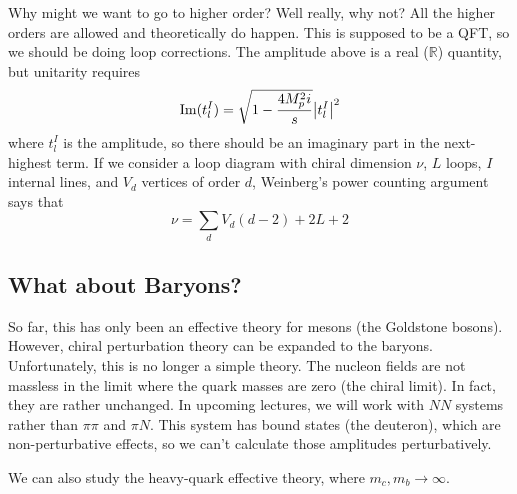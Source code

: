 \documentclass[a4paper,twoside,master.tex]{subfiles}
\begin{document}
Why might we want to go to higher order? Well really, why not? All the higher orders are allowed and theoretically do happen. This is supposed to be a QFT, so we should be doing loop corrections. The amplitude above is a real ($ \mathbb{R} $) quantity, but unitarity requires
\begin{equation}
    \Im(t_l^I) = \sqrt{1 - \frac{4 M^2_pi}{s}} \abs{t_l^I}^2
\end{equation}
where $ t_l^I $ is the amplitude, so there should be an imaginary part in the next-highest term. If we consider a loop diagram with chiral dimension $ \nu $, $ L $ loops, $ I $ internal lines, and $ V_d $ vertices of order $ d $, Weinberg's power counting argument says that
\begin{equation}
    \nu = \sum_d V_d(d - 2) + 2L + 2
\end{equation}

\subsection{What about Baryons?}
\label{sub:what_about_baryons?}


So far, this has only been an effective theory for mesons (the Goldstone bosons). However, chiral perturbation theory can be expanded to the baryons. Unfortunately, this is no longer a simple theory. The nucleon fields are not massless in the limit where the quark masses are zero (the chiral limit). In fact, they are rather unchanged. In upcoming lectures, we will work with $ NN $ systems rather than $ \pi \pi $ and $ \pi N $. This system has bound states (the deuteron), which are non-perturbative effects, so we can't calculate those amplitudes perturbatively.

We can also study the heavy-quark effective theory, where $ m_c, m_b \to \infty $.
\end{document}
